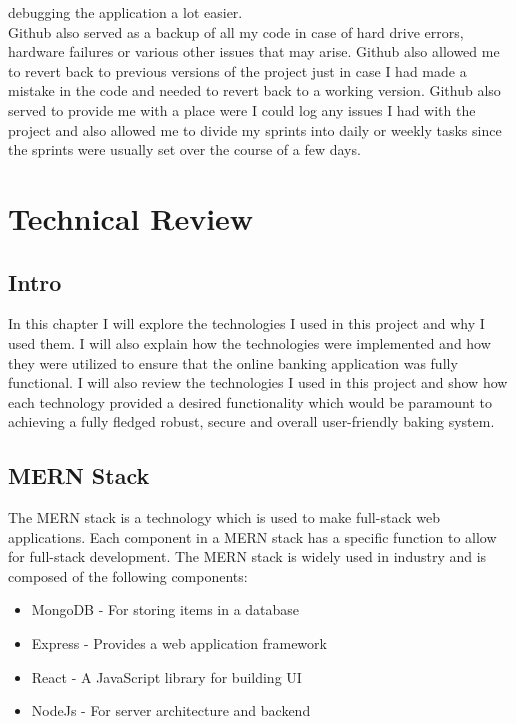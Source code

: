  debugging the application a lot easier.
\\
  Github also served as a backup of all my code in case of hard drive errors, hardware failures or various other issues that may arise.  Github also allowed me to revert back to previous versions of the project just in case I had made a mistake in the code and needed to revert back to a working version.  Github also served to provide me with a place were I could log any issues I had with the project and also allowed me to divide my sprints into daily or weekly tasks since the sprints were usually set over the course of a few days.
\chapter{Technical Review}
\section{Intro}
In this chapter I will explore the technologies I used in this project and why I used them.  I will also explain how the technologies were implemented and how they were utilized to ensure that the online banking application was fully functional.  I will also review the technologies I used in this project and show how each technology provided a desired functionality which would be paramount to achieving a fully fledged robust, secure and overall user-friendly baking system.
\section{MERN Stack}
The MERN stack is a technology which is used to make full-stack web applications.  Each component in a MERN stack has a specific function to allow for full-stack development.  The MERN stack is widely used in industry and is composed of the following components:
 \begin{itemize}
  \item MongoDB - For storing items in a database
  \item Express - Provides a web application framework
  \item React - A JavaScript library for building UI
  \item NodeJs - For server architecture and backend
\end{itemize}
